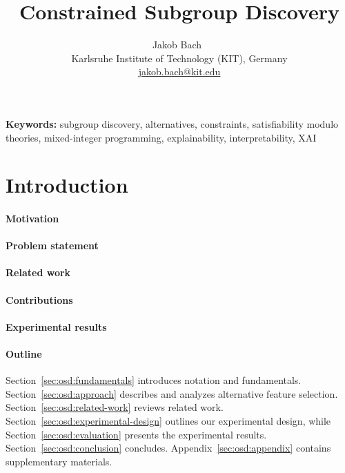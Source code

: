 \documentclass{article}
\title{
	Constrained Subgroup Discovery
}
\author{
	Jakob Bach~\orcidlink{0000-0003-0301-2798}\\
	\small Karlsruhe Institute of Technology (KIT), Germany\\
	\small \href{mailto:jakob.bach@kit.edu}{jakob.bach@kit.edu}
}
\date{} %
\theoremstyle{definition}
\begin{document}
\maketitle

\begin{abstract}
\end{abstract}
%
\textbf{Keywords:} subgroup discovery, alternatives, constraints, satisfiability modulo theories, mixed-integer programming, explainability, interpretability, XAI

\section{Introduction}
\label{sec:osd:introduction}

\paragraph{Motivation}

\cite{carvalho2019machine} \cite{molnar2020interpretable}

\paragraph{Problem statement}

\paragraph{Related work}

\paragraph{Contributions}

\paragraph{Experimental results}

\paragraph{Outline}

Section~\ref{sec:osd:fundamentals} introduces notation and fundamentals.
Section~\ref{sec:osd:approach} describes and analyzes alternative feature selection.
Section~\ref{sec:osd:related-work} reviews related work.
Section~\ref{sec:osd:experimental-design} outlines our experimental design, while Section~\ref{sec:osd:evaluation} presents the experimental results.
Section~\ref{sec:osd:conclusion} concludes.
Appendix~\ref{sec:osd:appendix} contains supplementary materials.
\end{document}
